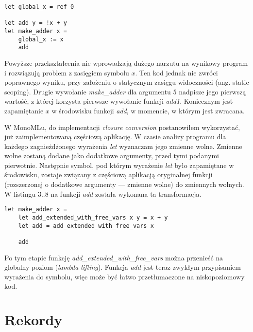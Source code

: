 \documentclass[declaration,shortabstract]{iithesis}
\begin{document}
\begin{lstlisting}[frame=single, caption={Wprowadzenie globalnej zmiennej.}]
let global_x = ref 0

let add y = !x + y 
let make_adder x = 
    global_x := x
    add 
\end{lstlisting}
Powyższe przekształcenia nie wprowadzają dużego narzutu na wynikowy program i rozwiązują 
problem z zasięgiem symbolu $x$. Ten kod jednak nie zwróci poprawnego wyniku, 
przy założeniu o statycznym zasięgu widoczności (ang. static scoping). Drugie 
wywołanie \textit{make\_adder} dla argumentu 5 nadpisze jego pierwszą wartość, 
z której korzysta pierwsze wywołanie funkcji \textit{add1}. 
Koniecznym jest zapamiętanie $x$ w środowisku funkcji 
\textit{add}, w momencie, w którym jest zwracana. 

W MonoMLu, do implementacji \textit{closure conversion} postanowiłem wykorzystać,
już zaimplementowaną częściową aplikację. W czasie analizy programu dla każdego 
zagnieżdżonego wyrażenia \textit{let} wyznaczam jego zmienne wolne. Zmienne wolne
zostaną dodane jako dodatkowe argumenty, przed tymi podanymi pierwotnie.
Następnie symbol, pod którym wyrażenie \textit{let} było zapamiętane w 
środowisku, zostaje związany z częściową aplikacją oryginalnej funkcji 
(rozszerzonej o dodatkowe argumenty --- zmienne wolne) do zmiennych wolnych.
W listingu $3..8$ na funkcji \textit{add} została wykonana ta transformacja.

\begin{lstlisting}[frame=single, caption={Rozszerzenie funkcji o jej zmienne wolne.}]
let make_adder x = 
    let add_extended_with_free_vars x y = x + y
    let add = add_extended_with_free_vars x

    add
\end{lstlisting}

Po tym etapie funkcję \textit{add\_extended\_with\_free\_vars} można przenieść 
na globalny poziom (\textit{lambda lifting}). Funkcja \textit{add} jest teraz zwykłym 
przypisaniem wyrażenia do symbolu, więc może być łatwo przetłumaczone na 
niskopoziomowy kod.




\section{Rekordy}
\end{document}
